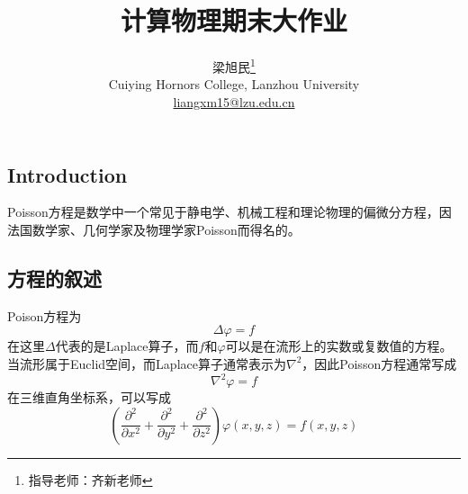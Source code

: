 \documentclass[twoside,twocolumn]{article}
\begin{document}
\begin{CJK*}{UTF8}{gkai}

\setlength{\droptitle}{-4\baselineskip} %
\pretitle{\begin{center}\Huge\bfseries} %
	\posttitle{\end{center}} %
\title{计算物理期末大作业} %
\author{
	\textsc{梁旭民}\thanks{\noindent 指导老师：齐新老师} \\[1ex] %
	\normalsize Cuiying Hornors College, Lanzhou University \\ %
	\normalsize \href{mailto:liangxm15@lzu.edu.cn}{liangxm15@lzu.edu.cn} %
}
\date{}
\renewcommand{\maketitlehookd}{
	\begin{abstract}
		本次作业求解的是矩形导体边界接地情况下内部有一个点电荷的Poisson方程和圆形导体边界接地情况下内部有一个点电荷的Poisson方程，通过在Cartesian坐标系和极坐标系下分别生成差分格式矩阵，并处理对应的点电荷，得到了线性方程组。分别利用Gauss消元法、Jacobi迭代法、Gauss Seidel迭代法和SOR超松弛迭代法，可以解出线性方程组，即通过有限差分法求得了Poisson方程的解，不断增加了分成的格点我们可以比较不同方法求解线性方程的速度快慢。
	\end{abstract}
}
\maketitle


\section{Introduction}
	Poisson方程是数学中一个常见于静电学、机械工程和理论物理的偏微分方程，因法国数学家、几何学家及物理学家Poisson而得名的。
	\subsection{方程的叙述}
	Poison方程为
	\begin{equation*}
	\Delta\varphi=f
	\end{equation*}
	在这里$\Delta$代表的是Laplace算子，而$f$和$\varphi$可以是在流形上的实数或复数值的方程。当流形属于Euclid空间，而Laplace算子通常表示为${\nabla}^2$，因此Poisson方程通常写成
	\begin{equation*}
	{\nabla}^{2}\varphi=f
	\end{equation*}
	在三维直角坐标系，可以写成
	\begin{equation*}
	\left( \frac{\partial^2}{\partial x^2} + \frac{\partial^2}{\partial y^2} + \frac{\partial^2}{\partial z^2} \right)\varphi(x,y,z) = f(x,y,z)
	\end{equation*}
	

\end{CJK*}
\end{document}
